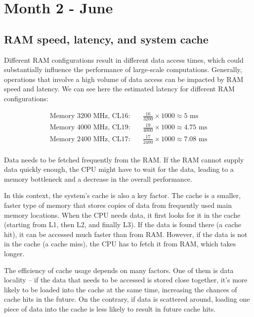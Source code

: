 \clearpage

\section{Month 2 - June}

\subsection{RAM speed, latency, and system cache}

Different RAM configurations result in different data access times, which could substantially influence the performance of large-scale computations. Generally, operations that involve a high volume of data access can be impacted by RAM speed and latency. We can see here the estimated latency for different RAM configurations:

\vspace{-1.5em}
\begin{equation*}
\begin{split}
    \text{Memory 3200 MHz, CL16:} & \quad \frac{16}{3200} \times 1000 \approx 5 \text{ ms} \\
    \text{Memory 4000 MHz, CL19:} & \quad \frac{19}{4000} \times 1000 \approx 4.75 \text{ ms} \\
    \text{Memory 2400 MHz, CL17:} & \quad \frac{17}{2400} \times 1000 \approx 7.08 \text{ ms} \\
\end{split}
\end{equation*}

Data needs to be fetched frequently from the RAM. If the RAM cannot supply data quickly enough, the CPU might have to wait for the data, leading to a memory bottleneck and a decrease in the overall performance.

In this context, the system's cache is also a key factor. The cache is a smaller, faster type of memory that stores copies of data from frequently used main memory locations. When the CPU needs data, it first looks for it in the cache (starting from L1, then L2, and finally L3). If the data is found there (a cache hit), it can be accessed much faster than from RAM. However, if the data is not in the cache (a cache miss), the CPU has to fetch it from RAM, which takes longer.

The efficiency of cache usage depends on many factors. One of them is data locality – if the data that needs to be accessed is stored close together, it's more likely to be loaded into the cache at the same time, increasing the chances of cache hits in the future. On the contrary, if data is scattered around, loading one piece of data into the cache is less likely to result in future cache hits.

